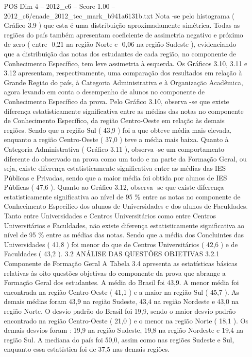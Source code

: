 \begin{textsample}{POS Dim 4 – 2012\_c6 – Score 1.00 – 2012\_c6/enade\_2012\_tec\_mark\_b941a6131b.txt}
Nota -se pelo histograma ( Gráfico 3.9 ) que esta é uma distribuição aproximadamente simétrica.
Todas as regiões do país também apresentam coeficiente de assimetria negativo e próximo de zero ( entre -0,21 na região Norte e -0,06 na região Sudeste ), evidenciando que a distribuição das notas dos estudantes de cada região, no componente de Conhecimento Específico, tem leve assimetria à esquerda.
Os Gráficos 3.10, 3.11 e 3.12 apresentam, respectivamente, uma comparação dos resultados em relação à Grande Região do país, à Categoria Administrativa e à Organização Acadêmica, agora levando em conta o desempenho de alunos no componente de Conhecimento Específico da prova.
Pelo Gráfico 3.10, observa -se que existe diferença estatisticamente significativa entre as médias das notas no componente de Conhecimento Específico, da região Centro-Oeste em relação às demais regiões.
Sendo que a região Sul ( 43,9 ) foi a que obteve média mais elevada, enquanto a região Centro-Oeste ( 37,0 ) teve a média mais baixa.
Quanto à Categoria Administrativa ( Gráfico 3.11 ), observa -se um comportamento diferente do observado na prova como um todo e na parte da Formação Geral, ou seja, existe diferença estatisticamente significativa entre as médias das IES Públicas e Privadas, sendo que a maior média foi obtida por alunos de IES Públicas ( 47,6 ).
Quanto ao Gráfico 3.12, observa -se que existe diferença estatisticamente significativa ao nível de 95 \% entre as notas no componente de Conhecimento Específico dos alunos de Universidades e dos alunos de Faculdades.
Tanto entre Universidades e Centros Universitários como entre Centros Universitários e Faculdades, não existe diferença estatisticamente significativa ao nível de 95 \% entre as médias das notas.
Sendo que a média dos Concluintes das Universidades ( 41,8 ) foi menor do que de Centros Universitários ( 42,6 ) e de Faculdades ( 43,2 ). 3.2 ANÁLISE DAS QUESTÕES OBJETIVAS 3.2.1 Componente de Formação Geral A Tabela 3.4 apresenta as estatísticas básicas relativas às oito questões objetivas do componente da prova que abrange a Formação Geral dos estudantes.
A média do Brasil foi 43,9.
A menor média foi encontrada na região Centro-Oeste ( 41,1 ) e a maior na região Sul ( 45,7 ).
As demais médias foram 43,9 na região Sudeste, 43,4 na região Nordeste e 43,0 na região Norte.
O desvio padrão do Brasil foi 19,9, sendo o maior desvio padrão encontrado na região Centro-Oeste ( 21,0 ) e o menor na região Norte ( 18,1 ).
Os demais desvios foram : 19,9 na região Sudeste, 19,8 na região Nordeste e 19,4 na região Sul.
A mediana do país foi 50,0, assim como nas regiões Sudeste e Sul, enquanto essa estatística foi de 37,5 nas demais regiões.

\end{textsample}

